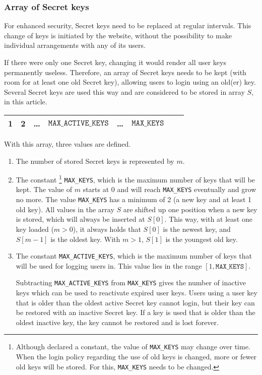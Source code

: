 \subsubsection{Array of Secret keys}
For enhanced security,
Secret keys need to be replaced at regular intervals.
This change of keys is initiated by the website,
without the possibility to make individual arrangements with any of its users.
\par
If there were only one Secret key,
changing it would render all user keys permanently useless.
Therefore,
an array of Secret keys needs to be kept
(with room for at least one old Secret key),
allowing users to login using an old(er) key.
Several Secret keys are used this way and
are considered to be stored in array $S$, in this article.
\begin{table}[h]
\begin{tabular}{|c|c|c|c|c|c|c|c|}
\hline
1 & 2 & \ldots & $\mathtt{MAX\_ACTIVE\_KEYS}$ & \ldots & $\mathtt{MAX\_KEYS}$ \\
\hline
\end{tabular}
\end{table}
\par
With this array, three values are defined.
\begin{enumerate}
\item	The number of stored Secret keys is represented by $m$.
\item	The constant%
\footnote{Although declared a constant, the value of \texttt{MAX\_KEYS} may change over time.
When the login policy regarding the use of old keys is changed, more or fewer old keys will be stored.
For this, \texttt{MAX\_KEYS} needs to be changed.}
\texttt{MAX\_KEYS}, which is the maximum number of keys that will be kept.
The value of $m$ starts at 0 and will reach \texttt{MAX\_KEYS} eventually and grow no more.
The value \texttt{MAX\_KEYS} has a minimum of 2 (a new key and at least 1 old key).
All values in the array $S$ are shifted up one position when a new key is stored, which will always be inserted at $S[0]$.
This way, with at least one key loaded ($m>0$), it always holds that $S[0]$ is the newest key,
and $S[m-1]$ is the oldest key.
With $m>1$, $S[1]$ is the youngest old key.
\item	The constant \texttt{MAX\_ACTIVE\_KEYS},
which is the maximum number of keys that will be used for logging users in.
This value lies in the range $[1, \mathtt{MAX\_KEYS}]$.
\par
Subtracting \texttt{MAX\_ACTIVE\_KEYS} from \texttt{MAX\_KEYS}
gives the number of inactive keys which can be used to reactivate expired user keys.
Users using a user key that is older than the oldest active Secret key cannot login,
but their key can be restored with an inactive Secret key.
If a key is used that is older than the oldest inactive key,
the key cannot be restored and is lost forever.
\end{enumerate}
